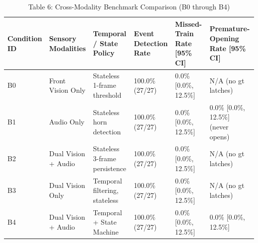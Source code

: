 \begin{table}[t]
\centering
\caption{Table 6: Cross-Modality Benchmark Comparison (B0 through B4)}
\label{tab:table06_modality_comparison}
\begin{tabular}{llllll}
\hline
Condition ID & Sensory Modalities & Temporal / State Policy & Event Detection Rate & Missed-Train Rate [95\% CI] & Premature-Opening Rate [95\% CI] \\
\hline
B0 & Front Vision Only & Stateless 1-frame threshold & 100.0\% (27/27) & 0.0\% [0.0\%, 12.5\%] & N/A (no gt latches) \\
B1 & Audio Only & Stateless horn detection & 100.0\% (27/27) & 0.0\% [0.0\%, 12.5\%] & 0.0\% [0.0\%, 12.5\%] (never opens) \\
B2 & Dual Vision + Audio & Stateless 3-frame persistence & 100.0\% (27/27) & 0.0\% [0.0\%, 12.5\%] & N/A (no gt latches) \\
B3 & Dual Vision Only & Temporal filtering, stateless & 100.0\% (27/27) & 0.0\% [0.0\%, 12.5\%] & N/A (no gt latches) \\
B4 & Dual Vision + Audio & Temporal + State Machine & 100.0\% (27/27) & 0.0\% [0.0\%, 12.5\%] & 0.0\% [0.0\%, 12.5\%] \\
\hline
\end{tabular}
\end{table}
